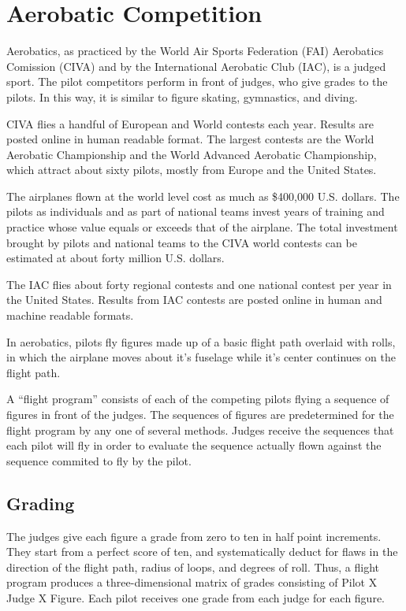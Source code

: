 \section{Aerobatic Competition}

Aerobatics, as practiced by the World Air Sports Federation (FAI)
Aerobatics Comission (CIVA) and by the International Aerobatic Club (IAC),
is a judged sport. The pilot competitors perform in front of judges, who
give grades to the pilots. In this way, it is similar to figure skating,
gymnastics, and diving.

CIVA flies a handful of European and World contests each year.
Results are posted online \cite{civa-results} in human readable format.
The largest contests are the World Aerobatic Championship \cite{wac}
and the World Advanced Aerobatic Championship, which attract about sixty
pilots, mostly from Europe and the United States.

The airplanes flown at the world level cost as much as \$400,000 U.S. dollars.
The pilots as individuals and as part of national teams invest years of
training and practice whose value equals or exceeds that of the airplane.
The total investment brought by pilots and national teams to the
CIVA world contests can be estimated at about forty million U.S. dollars.

The IAC flies about forty regional contests and one national contest
per year in the United States.
Results from IAC contests are posted online \cite{iaccdb}
in human and machine readable formats.

In aerobatics, pilots fly figures made up of a basic flight path
overlaid with rolls, in which the airplane moves about it's fuselage
while it's center continues on the flight path.

A ``flight program'' consists of each of the competing pilots flying a sequence
of figures in front of the judges. The sequences of figures are predetermined
for the flight program by any one of several methods.
Judges receive the sequences that each pilot will fly in order to evaluate
the sequence actually flown against the sequence commited to fly by the pilot.

\subsection{Grading}

The judges give each figure a grade from zero to ten in half point increments.
They start from a perfect score of ten, and systematically deduct for flaws in
the direction of the flight path, radius of loops, and degrees of roll.  Thus,
a flight program produces a three-dimensional matrix of grades consisting of
Pilot X Judge X Figure.  Each pilot receives one grade from each judge for each
figure.

